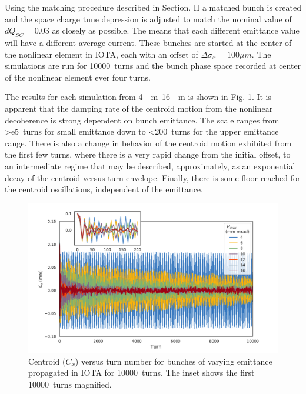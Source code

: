 \documentclass[aps,prstab,twocolumn, groupedaddress]{revtex4-1}
\begin{document}
Using the matching procedure described in Section. II a matched bunch is created and the 
space charge tune depression is adjusted to match the nominal value of $dQ_{SC} = 
0.03$ as closely as possible. The means that each different emittance value will have a 
different average current. These bunches are started at the center of the nonlinear 
element in IOTA, each with an offset of $\Delta \sigma_x = 100 \mu m$. The simulations 
are run for \SI{10000}{turns} and the bunch phase space recorded at center of the 
nonlinear element ever four turns. 

The results for each simulation from \SIrange{4}{16}{\mu m} is shown in Fig. 
\ref{fig:10kcentroids}. It is apparent that the damping rate of the centroid motion from the 
nonlinear decoherence is strong dependent on bunch emittance. The scale ranges from 
\SI{>e5}{turns} for small emittance down to \SI{<200}{turns} for the upper emittance 
range. There is also a change in behavior of the centroid motion exhibited from the first 
few turns, where there is a very rapid change from the initial offset, to an intermediate 
regime that may be described, approximately, as an exponential decay of the centroid 
versus turn envelope. Finally, there is some floor reached for the centroid oscillations, 
independent of the emittance.

\begin{figure}
	\includegraphics[width=\columnwidth]{centroids_to_10k.pdf}%
	\caption{Centroid ($C_x$) versus turn number for bunches of varying emittance 
	propagated in IOTA for \SI{10000}{turns}. The inset shows the first \SI{10000}{turns} 
	magnified.}
	\label{fig:10kcentroids} 
\end{figure}
\end{document}
